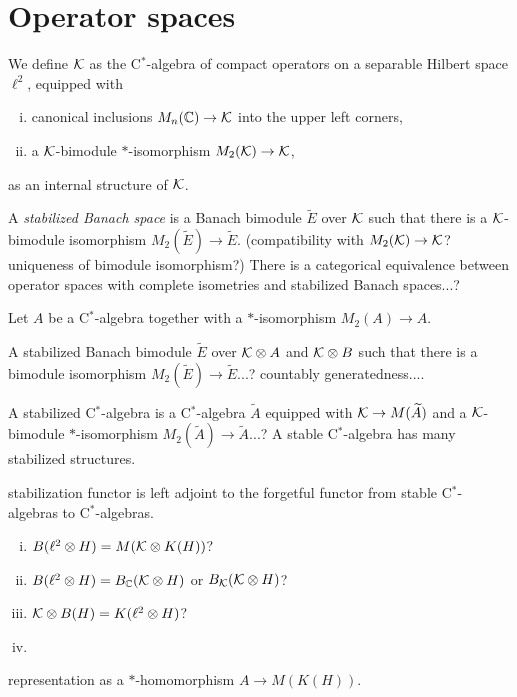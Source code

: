 \documentclass{../../large}
\begin{document}
\section{Operator spaces}

\begin{prb}
We define $\mathcal{K}$ as the C$^*$-algebra of compact operators on a separable Hilbert space $\ell^2$, equipped with
\begin{enumerate}[(i)]
\item canonical inclusions $M_n(\mathbb{C})\to\mathcal{K}$ into the upper left corners,
\item a $\mathcal{K}$-bimodule $*$-isomorphism $M_2(\mathcal{K})\to\mathcal{K}$,
\end{enumerate}
as an internal structure of $\mathcal{K}$.

A \emph{stabilized Banach space} is a Banach bimodule $\tilde E$ over $\mathcal{K}$ such that there is a $\mathcal{K}$-bimodule isomorphism $M_2(\tilde E)\to\tilde E$. (compatibility with $M_2(\mathcal{K})\to\mathcal{K}$? uniqueness of bimodule isomorphism?)
There is a categorical equivalence between operator spaces with complete isometries and stabilized Banach spaces...?

Let $A$ be a C$^*$-algebra together with a $*$-isomorphism $M_2(A)\to A$.


A stabilized Banach bimodule $\tilde E$ over $\mathcal{K}\otimes A$ and $\mathcal{K}\otimes B$ such that there is a bimodule isomorphism $M_2(\tilde E)\to\tilde E$...?
countably generatedness....

A stabilized C$^*$-algebra is a C$^*$-algebra $\tilde A$ equipped with $\mathcal{K}\to M(\widetilde A)$ and a $\mathcal{K}$-bimodule $*$-isomorphism $M_2(\tilde A)\to\tilde A$...?
A stable C$^*$-algebra has many stabilized structures.

stabilization functor is left adjoint to the forgetful functor from stable C$^*$-algebras to C$^*$-algebras.
\end{prb}



\begin{prb}
\begin{enumerate}[(i)]
\item $B(\ell^2\otimes H)=M(\mathcal{K}\otimes K(H))$?
\item $B(\ell^2\otimes H)=B_{\mathbb{C}}(\mathcal{K}\otimes H)$ or $B_{\mathcal{K}}(\mathcal{K}\otimes H)$?
\item $\mathcal{K}\otimes B(H)=K(\ell^2\otimes H)$?
\item 
\end{enumerate}

representation as a $*$-homomorphism $A\to M(K(H))$.
\end{prb}
\end{document}
